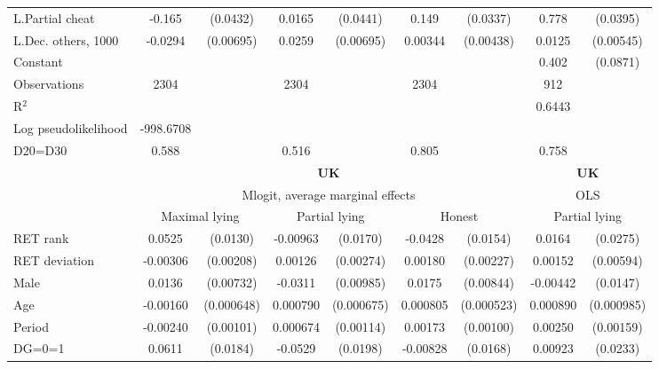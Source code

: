 \begin{tabular}{l|cccccc|cc}
L.Partial cheat &   -0.165\sym{***}& (0.0432)&   0.0165         & (0.0441)&    0.149\sym{***}& (0.0337)&    0.778\sym{***}& (0.0395)\\
L.Dec. others, 1000&  -0.0294\sym{***}&(0.00695)&   0.0259\sym{***}&(0.00695)&  0.00344         &(0.00438)&   0.0125\sym{**} &(0.00545)\\
Constant        &                  &         &                  &         &                  &         &    0.402\sym{***}& (0.0871)\\
\hline
Observations    &     2304         &         &     2304         &         &     2304         &         &      912         &         \\
R$^2$      &                  &         &                  &         &                  &         &         0.6443  &   \\ 
Log pseudolikelihood  &  -998.6708   &         &                  &         &                  &         &           &   \\ 
D20=D30         &    0.588         &         &    0.516         &         &    0.805         &         &    0.758         &         \\
\hline\hline
&\multicolumn{6}{c|}{\bf UK}&\multicolumn{2}{c}{\bf UK}\\ &\multicolumn{6}{c|}{Mlogit, average marginal effects }&\multicolumn{2}{c}{OLS}\\
                &\multicolumn{2}{c}{Maximal lying}&\multicolumn{2}{c}{Partial lying}&\multicolumn{2}{c}{Honest}  &\multicolumn{2}{c}{Partial lying}\\
\hline
RET rank        &   0.0525\sym{***}& (0.0130)& -0.00963         & (0.0170)&  -0.0428\sym{***}& (0.0154)&   0.0164         & (0.0275)\\
RET deviation   & -0.00306         &(0.00208)&  0.00126         &(0.00274)&  0.00180         &(0.00227)&  0.00152         &(0.00594)\\
Male            &   0.0136\sym{*}  &(0.00732)&  -0.0311\sym{***}&(0.00985)&   0.0175\sym{**} &(0.00844)& -0.00442         & (0.0147)\\
Age             & -0.00160\sym{**} &(0.000648)& 0.000790         &(0.000675)& 0.000805         &(0.000523)& 0.000890         &(0.000985)\\
Period          & -0.00240\sym{**} &(0.00101)& 0.000674         &(0.00114)&  0.00173\sym{*}  &(0.00100)&  0.00250         &(0.00159)\\
DG=0=1          &   0.0611\sym{***}& (0.0184)&  -0.0529\sym{***}& (0.0198)& -0.00828         & (0.0168)&  0.00923         & (0.0233)\\

\end{tabular}
